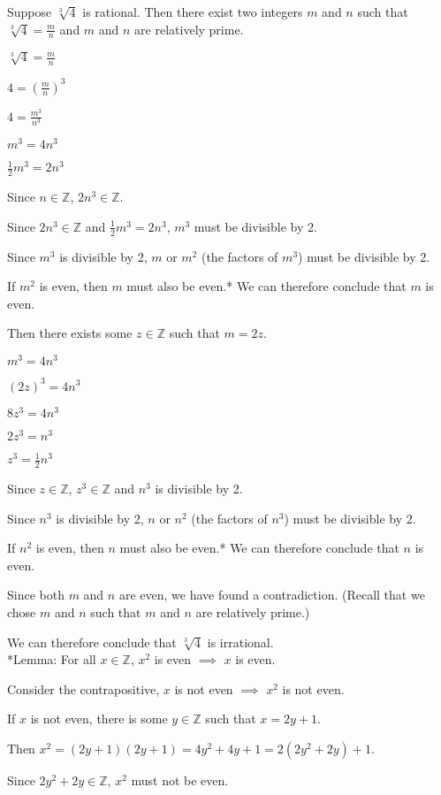 \documentclass[solution, letterpaper]{cs20inclass}
\begin{document}
\begin{solution}

Suppose $\sqrt[3]{4}$ is rational. Then there exist two integers $m$ and $n$ such that $\sqrt[3]{4} = \frac{m}{n}$ and $m$ and $n$ are relatively prime.

\begin{center}
$\sqrt[3]{4} = \frac{m}{n}$

$4 = (\frac{m}{n})^3$

$4 = \frac{m^3}{n^3}$

$m^3 = 4n^3$

$\frac{1}{2}m^3 = 2n^3$
\end{center}

Since $n \in \mathbb{Z}$, $2n^3 \in \mathbb{Z}$.

Since $2n^3 \in \mathbb{Z}$ and $\frac{1}{2}m^3 = 2n^3$, $m^3$ must be divisible by 2. 

Since $m^3$ is divisible by 2, $m$ or $m^2$ (the factors of $m^3$) must be divisible by 2.

If $m^2$ is even, then $m$ must also be even.* We can therefore conclude that $m$ is even.

Then there exists some $z \in \mathbb{Z}$ such that $m=2z$.

\begin{center}
$m^3 = 4n^3$

$(2z)^3 = 4n^3$

$8z^3 = 4n^3$

$2z^3 = n^3$

$z^3 = \frac{1}{2}n^3$
\end{center}

Since $z \in \mathbb{Z}$, $z^3 \in \mathbb{Z}$ and $n^3$ is divisible by 2.

Since $n^3$ is divisible by 2, $n$ or $n^2$ (the factors of $n^3$) must be divisible by 2.

If $n^2$ is even, then $n$ must also be even.* We can therefore conclude that $n$ is even.

Since both $m$ and $n$ are even, we have found a contradiction. (Recall that we chose $m$ and $n$ such that $m$ and $n$ are relatively prime.)

We can therefore conclude that $\sqrt[3]{4}$ is irrational.\\

*Lemma: For all $x \in \mathbb{Z}$, $x^2$ is even $\implies$ $x$ is even. 

Consider the contrapositive, $x$ is not even $\implies$ $x^2$ is not even.

If $x$ is not even, there is some $y \in \mathbb{Z}$ such that $x = 2y + 1$.

Then $x^2 = (2y+1)(2y+1) = 4y^2 + 4y + 1 = 2(2y^2+2y)+1$.

Since $2y^2+2y \in \mathbb{Z}$, $x^2$ must not be even.

\end{solution}
\end{document}
